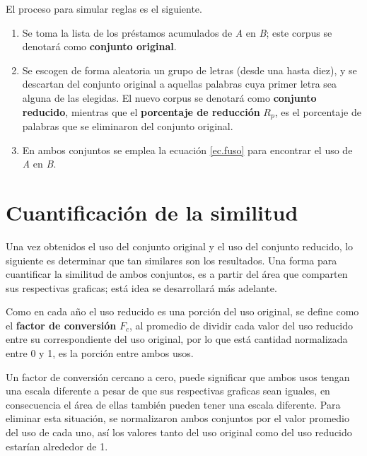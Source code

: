 El proceso para simular reglas es el siguiente. 

\begin{enumerate}
	
	\item Se toma la lista de los préstamos acumulados de \textit{A} en \textit{B}; este corpus se denotará como \textbf{conjunto original}.
	
	\item Se escogen de forma aleatoria un grupo de letras (desde una hasta diez), y se descartan del conjunto original a aquellas  palabras cuya primer letra sea alguna de las elegidas. El nuevo corpus se denotará como \textbf{conjunto reducido}, mientras que el \textbf{porcentaje de reducción} $R_{p}$, es el porcentaje de palabras que se eliminaron del conjunto original. 
	
	
	\item En ambos conjuntos se emplea la ecuación \ref{ec.fuso} para encontrar el uso de \textit{A} en \textit{B}. %
	
\end{enumerate}

\section{Cuantificación de la similitud}

Una vez obtenidos el uso del conjunto original y el uso del conjunto reducido, lo siguiente es determinar que tan similares son los resultados. Una forma para cuantificar la similitud de ambos conjuntos, es a partir del área que comparten sus respectivas graficas; está idea se desarrollará más adelante.  

Como en cada año el uso reducido es una porción del uso original, se define como el \textbf{factor de conversión} $F_{c}$, al promedio de dividir cada valor del uso reducido entre su correspondiente del uso original, por lo que está cantidad normalizada entre 0 y 1, es la porción entre ambos usos. 

Un factor de conversión cercano a cero, puede significar que ambos usos tengan una escala diferente a pesar de que sus respectivas graficas sean iguales, en consecuencia el área de ellas también pueden tener una escala diferente.  Para eliminar esta situación, se normalizaron ambos conjuntos por el valor promedio del uso de cada uno,  así los valores tanto del uso original como del uso reducido estarían alrededor de 1.  

